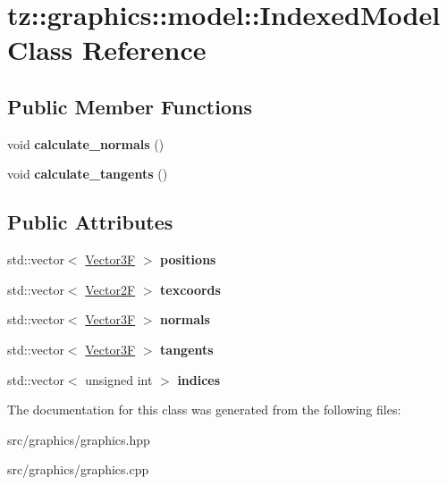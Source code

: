 \hypertarget{classtz_1_1graphics_1_1model_1_1_indexed_model}{}\section{tz\+:\+:graphics\+:\+:model\+:\+:Indexed\+Model Class Reference}
\label{classtz_1_1graphics_1_1model_1_1_indexed_model}
\subsection*{Public Member Functions}
\begin{DoxyCompactItemize}
\item 
\mbox{\label{classtz_1_1graphics_1_1model_1_1_indexed_model_a019b4f8c72e1e7dd37d2d3ec452cfa3b}} 
void {\bfseries calculate\+\_\+normals} ()
\item 
\mbox{\label{classtz_1_1graphics_1_1model_1_1_indexed_model_ae5dae45074924bcdfbc2adf2ec13f0ec}} 
void {\bfseries calculate\+\_\+tangents} ()
\end{DoxyCompactItemize}
\subsection*{Public Attributes}
\begin{DoxyCompactItemize}
\item 
\mbox{\label{classtz_1_1graphics_1_1model_1_1_indexed_model_ae94e4a6c4f1dc9bac6c003eda93d849f}} 
std\+::vector$<$ \mbox{\hyperlink{class_vector3}{Vector3F}} $>$ {\bfseries positions}
\item 
\mbox{\label{classtz_1_1graphics_1_1model_1_1_indexed_model_a51345de6dc0c2773d503a367a07c9456}} 
std\+::vector$<$ \mbox{\hyperlink{class_vector2}{Vector2F}} $>$ {\bfseries texcoords}
\item 
\mbox{\label{classtz_1_1graphics_1_1model_1_1_indexed_model_a4a9e2cc61d38cb598ae00acb771bd58e}} 
std\+::vector$<$ \mbox{\hyperlink{class_vector3}{Vector3F}} $>$ {\bfseries normals}
\item 
\mbox{\label{classtz_1_1graphics_1_1model_1_1_indexed_model_affe23c0f119019eed8e95f09c4404131}} 
std\+::vector$<$ \mbox{\hyperlink{class_vector3}{Vector3F}} $>$ {\bfseries tangents}
\item 
\mbox{\label{classtz_1_1graphics_1_1model_1_1_indexed_model_a1b87b564e60fdb25df24515567fa4040}} 
std\+::vector$<$ unsigned int $>$ {\bfseries indices}
\end{DoxyCompactItemize}


The documentation for this class was generated from the following files\+:\begin{DoxyCompactItemize}
\item 
src/graphics/graphics.\+hpp\item 
src/graphics/graphics.\+cpp\end{DoxyCompactItemize}
